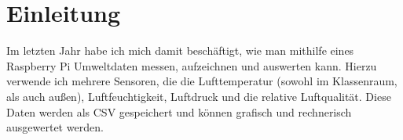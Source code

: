 \chapter{Einleitung}

Im letzten Jahr habe ich mich damit beschäftigt, wie man mithilfe eines Raspberry Pi Umweltdaten messen, aufzeichnen und auswerten kann. Hierzu verwende ich mehrere Sensoren, die die Lufttemperatur (sowohl im Klassenraum, als auch außen), Luftfeuchtigkeit, Luftdruck und die relative Luftqualität. Diese Daten werden als \gls{CSV} gespeichert und können grafisch und rechnerisch ausgewertet werden.


